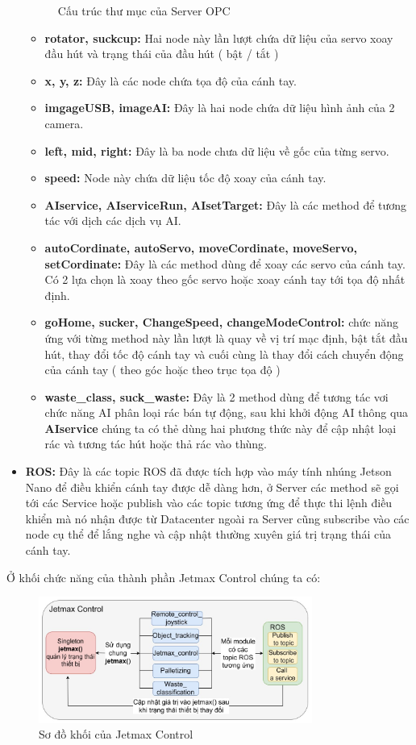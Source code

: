\begin{itemize}
\begin{figure}[!h]
            \caption{Cấu trúc thư mục của Server OPC}
        \end{figure}
    \begin{itemize}
        \item \textbf{rotator, suckcup:} Hai node này lần lượt chứa dữ liệu của servo xoay đầu hút và trạng thái của đầu hút ( bật / tắt )
        \item  \textbf{x, y, z:} Đây là các node chứa tọa độ của cánh tay.
        \item \textbf{imgageUSB, imageAI:} Đây là hai node chứa dữ liệu hình ảnh của 2 camera.
        \item  \textbf{left, mid, right:} Đây là ba node chưa dữ liệu về gốc của từng servo.
        \item  \textbf{speed:} Node này chứa dữ liệu tốc độ xoay của cánh tay.
        \item \textbf{AIservice, AIserviceRun, AIsetTarget:} Đây là các method để tương tác với dịch các dịch vụ AI.
        \item \textbf{autoCordinate, autoServo, moveCordinate, moveServo, setCordinate:}  Đây là các method dùng để xoay các servo của cánh tay. Có 2 lựa chọn là xoay theo gốc servo hoặc xoay cánh tay tới tọa độ nhất định.
        \item \textbf{goHome, sucker, ChangeSpeed, changeModeControl:} chức năng ứng với từng method này lần lượt là quay về vị trí mạc định, bật tắt đầu hút, thay đổi tốc độ cánh tay và cuối cùng là thay đổi cách chuyển động của cánh tay ( theo góc hoặc theo trục tọa độ )
        \item \textbf{waste\_class, suck\_waste:} Đây là 2 method dùng để tương tác vơi chức năng AI phân loại rác bán tự động, sau khi khởi động AI thông qua \textbf{AIservice} chúng ta có thẻ dùng hai phương thức này để cập nhật loại rác và tương tác hút hoặc thả rác vào thùng.
    \end{itemize}
    \item \textbf{ROS:} Đây là các topic ROS đã được tích hợp vào máy tính nhúng Jetson Nano để điều khiển cánh tay được dễ dàng hơn, ở Server các method sẽ gọi tới các Service hoặc publish vào các topic tương ứng để thực thi lệnh điều khiển mà nó nhận được từ Datacenter ngoài ra Server cũng subscribe vào các node cụ thể để lắng nghe và cập nhật thường xuyên giá trị trạng thái của cánh tay.
\end{itemize}
Ở khối chức năng của thành phần Jetmax Control chúng ta có:
\begin{figure}[!h]
    \centering
    \includegraphics[width=0.8\textwidth]{Images/Implementation/Control/Jetmax_control_block.jpg}
    \caption{Sơ đồ khối của Jetmax Control}
\end{figure}
